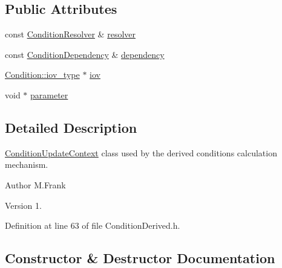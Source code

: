 \subsection*{Public Attributes}
\begin{DoxyCompactItemize}
\item 
const \hyperlink{class_d_d4hep_1_1_conditions_1_1_condition_resolver}{Condition\+Resolver} \& \hyperlink{class_d_d4hep_1_1_conditions_1_1_condition_update_context_afec7d015ccb53ab2c84eec000846b15d}{resolver}
\item 
const \hyperlink{class_d_d4hep_1_1_conditions_1_1_condition_dependency}{Condition\+Dependency} \& \hyperlink{class_d_d4hep_1_1_conditions_1_1_condition_update_context_aaea028db7dc9ed95d2a5f34a4a2a3efd}{dependency}
\item 
\hyperlink{class_d_d4hep_1_1_conditions_1_1_condition_ad84300e226b2085ec5e9db7f47be5539}{Condition\+::iov\+\_\+type} $\ast$ \hyperlink{class_d_d4hep_1_1_conditions_1_1_condition_update_context_acdeb1015159a6df55df3c3e614651d4e}{iov}
\item 
void $\ast$ \hyperlink{class_d_d4hep_1_1_conditions_1_1_condition_update_context_adad82de460a5c71b568e73e2f76923ba}{parameter}
\end{DoxyCompactItemize}


\subsection{Detailed Description}
\hyperlink{class_d_d4hep_1_1_conditions_1_1_condition_update_context}{Condition\+Update\+Context} class used by the derived conditions calculation mechanism. 

\begin{DoxyAuthor}{Author}
M.\+Frank 
\end{DoxyAuthor}
\begin{DoxyVersion}{Version}
1. 
\end{DoxyVersion}


Definition at line 63 of file Condition\+Derived.\+h.



\subsection{Constructor \& Destructor Documentation}
\hypertarget{class_d_d4hep_1_1_conditions_1_1_condition_update_context_a259338f84924fdd338add25e7f951858}{}\label{class_d_d4hep_1_1_conditions_1_1_condition_update_context_a259338f84924fdd338add25e7f951858} 
